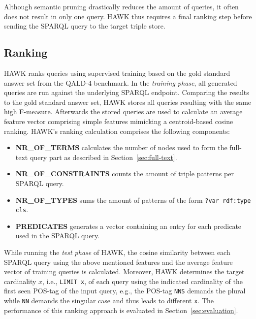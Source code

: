 Although semantic pruning drastically reduces the amount of queries, it often does not result in only one query. HAWK thus requires a final ranking step before sending the SPARQL query to the target triple store.

\subsection{Ranking}
HAWK ranks queries using supervised training based on the gold standard answer set from the QALD-4 benchmark.
In the \emph{training phase}, all generated queries are run against the underlying SPARQL endpoint. 
Comparing the results to the gold standard answer set, HAWK stores all queries resulting with the same high F-measure.
Afterwards the stored queries are used to calculate an average feature vector comprising simple features mimicking a centroid-based cosine ranking.
HAWK's ranking calculation comprises the following components:
\begin{itemize}
\item \textbf{NR\_OF\_TERMS} calculates the number of nodes used to form the full-text query part as described in Section~\ref{sec:full-text}.
\item \textbf{NR\_OF\_CONSTRAINTS} counts the amount of triple patterns per SPARQL query.
\item \textbf{NR\_OF\_TYPES} sums the amount of patterns of the form \texttt{?var rdf:type cls}.
\item \textbf{PREDICATES} generates a vector containing an entry for each predicate used in the SPARQL query.
\end{itemize}

While running the \emph{test phase} of HAWK, the cosine similarity between each SPARQL query using the above mentioned features and the average feature vector of training queries is calculated.
Moreover, HAWK determines the target cardinality $x$, i.e., \texttt{LIMIT x}, of each query using the indicated cardinality of the first seen POS-tag of the input query, e.g., the POS-tag \texttt{NNS} demands the plural while \texttt{NN} demands the singular case and thus leads to different \texttt{x}.
The performance of this ranking approach is evaluated in Section~\ref{sec:evaluation}.

